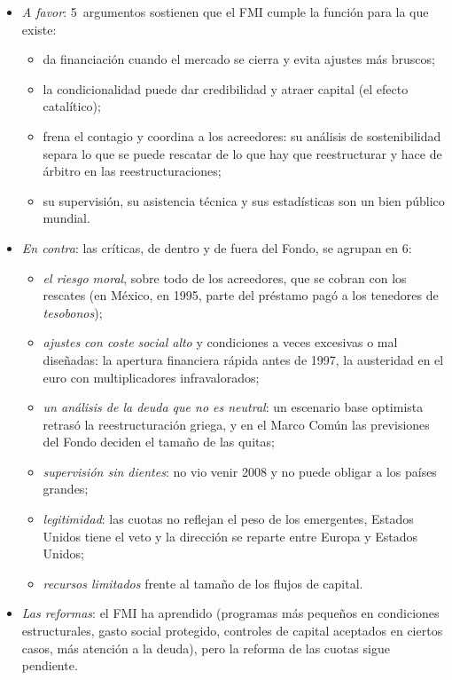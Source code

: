 \documentclass[11pt]{article}
\begin{document}
\begin{itemize}
\item \emph{A favor}: 5~argumentos sostienen que el FMI cumple la función para la que existe:
  \begin{itemize}
  \item da financiación cuando el mercado se cierra y evita ajustes más bruscos;
  \item la condicionalidad puede dar credibilidad y atraer capital (el efecto catalítico);
  \item frena el contagio y coordina a los acreedores: su análisis de sostenibilidad separa lo que se puede rescatar de lo que hay que reestructurar y hace de árbitro en las reestructuraciones;
  \item su supervisión, su asistencia técnica y sus estadísticas son un bien público mundial.
  \end{itemize}
\item \emph{En contra}: las críticas, de dentro y de fuera del Fondo, se agrupan en 6:
  \begin{itemize}
  \item \emph{el riesgo moral}, sobre todo de los acreedores, que se cobran con los rescates (en México, en 1995, parte del préstamo pagó a los tenedores de \emph{tesobonos});
  \item \emph{ajustes con coste social alto} y condiciones a veces excesivas o mal diseñadas: la apertura financiera rápida antes de 1997, la austeridad en el euro con multiplicadores infravalorados;
  \item \emph{un análisis de la deuda que no es neutral}: un escenario base optimista retrasó la reestructuración griega, y en el Marco Común las previsiones del Fondo deciden el tamaño de las quitas;
  \item \emph{supervisión sin dientes}: no vio venir 2008 y no puede obligar a los países grandes;
  \item \emph{legitimidad}: las cuotas no reflejan el peso de los emergentes, Estados Unidos tiene el veto y la dirección se reparte entre Europa y Estados Unidos;
  \item \emph{recursos limitados} frente al tamaño de los flujos de capital.
  \end{itemize}
\item \emph{Las reformas}: el FMI ha aprendido (programas más pequeños en condiciones estructurales, gasto social protegido, controles de capital aceptados en ciertos casos, más atención a la deuda), pero la reforma de las cuotas sigue pendiente.
\end{itemize}
\end{document}
